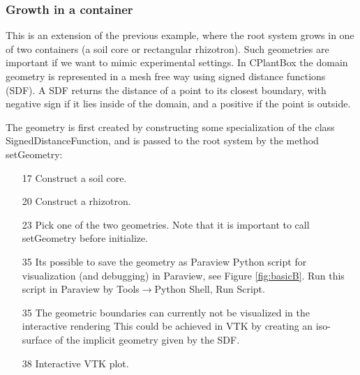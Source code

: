 
\subsubsection*{Growth in a container}

This is an extension of the previous example, where the root system grows in one of two containers 
(a soil core or rectangular rhizotron). Such geometries are important if we want to mimic experimental settings. 
In CPlantBox the domain geometry is represented in a mesh free way using signed distance functions (SDF). 
A SDF returns the distance of a point to its closest boundary, with negative sign if it lies inside of the domain, 
and a positive if the point is outside.



The geometry is first created by constructing some specialization of the class SignedDistanceFunction, 
and is passed to the root system by the method setGeometry: 
\begin{itemize}
 \item[17] Construct a soil core. 
 \item[20] Construct a rhizotron.
 \item[23] Pick one of the two geometries. Note that it is important to call setGeometry before initialize.
 \item[35] Its possible to save the geometry as Paraview Python script for visualization (and debugging) in Paraview, 
 see Figure \ref{fig:basicB}. Run this script in Paraview by Tools$\rightarrow$Python Shell, Run Script.
\item[35] The geometric boundaries can currently not be visualized in the interactive rendering 
This could be achieved in VTK by creating an iso-surface of the implicit geometry given by the SDF.
\item[38] Interactive VTK plot. 
\end{itemize}
% 

